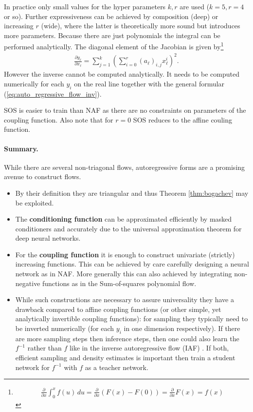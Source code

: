 \documentclass[12pt,a4paper]{article}
\begin{document}
In practice only small values for the hyper parameters $k, r$ are used ($k=5, r=4$ or so).  Further expressiveness can be achieved by composition (deep) or increasing $r$ (wide), where the latter is theoretically more sound but introduces more parameters. Because there are just polynomials the integral can be performed analytically. The diagonal element of the Jacobian is given by\footnote{\begin{align}
		\frac{\partial}{\partial x} \int _0 ^x f(u) \, du =\frac{\partial}{\partial x} \left(F(x) - F(0)\right)= \frac{\partial}{\partial x} F(x)= f(x)
\end{align}} 
\begin{align}
	\frac{\partial y_\ell}{\partial x_\ell} = \sum_{j=1}^k \left(\sum_{i=0}^r \left(a_\ell\right)_{i, j} x_\ell^i \right) ^2.
\end{align}
However the inverse cannot be computed analytically. It needs to be computed numerically for each $y_i$ on the real line together with the general formular (\ref{eq:auto_regressive_flow_inv}). 

SOS is easier to train than NAF as there are no constraints on parameters of the coupling function.
Also note that for $r=0$ SOS reduces to the affine couling function.



\paragraph{Summary.} While there are several non-triagonal flows, autoregressive forms are a promising avenue to construct flows. 
\begin{itemize}
	\item By their definition they are triangular and thus Theorem \ref{thm:bogachev} may be exploited. 
	\item The \textbf{conditioning function} can be approximated efficiently by masked conditioners and accurately due to the universal approximation theorem for deep neural networks. 
	\item For the \textbf{coupling function} it is enough to construct univariate (strictly) increasing functions. This can be achieved by care carefully designing a neural network as in NAF. More generally this can also achieved by integrating non-negative functions \cite{wehenkel_unconstraint_monotonic_neural_networks} as in the Sum-of-squares polynomial flow. 
	\item While such constructions are necessary to assure universality they have a drawback compared to affine coupling functions (or other simple, yet analytically invertible coupling functions): for sampling they typically need to be inverted numerically (for each $y_i$ in one dimension respectively). If there are more sampling steps then inference steps, then one could also learn the $f^{-1}$ rather than $f$ like in the inverse autoregressive flow (IAF) \cite{kingma_2016_iaf}. If both, efficient sampling and density estimates is important then \cite{oord_2017_parallel_wavenet} train a student network for $f^{-1}$ with $f$ as a teacher network.
\end{itemize}
\end{document}

